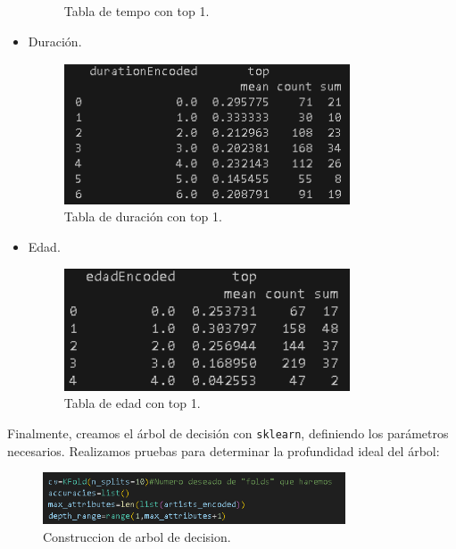 \documentclass[a4paper,12pt]{article}
\begin{document}
\begin{itemize}
\begin{figure}[H]
        \caption{Tabla de tempo con top 1.}
        \label{fig:decision_tree}
    \end{figure}
    \item Duración.
    \begin{figure}[H]
        \centering
        \includegraphics[width=0.8\textwidth]{24.png}
        \caption{Tabla de duración con top 1.}
        \label{fig:decision_tree}
    \end{figure}
    \item Edad.
    \begin{figure}[H]
        \centering
        \includegraphics[width=0.8\textwidth]{25.png}
        \caption{Tabla de edad con top 1.}
        \label{fig:decision_tree}
    \end{figure}
\end{itemize}

Finalmente, creamos el árbol de decisión con \texttt{sklearn}, definiendo los parámetros necesarios. Realizamos pruebas para determinar la profundidad ideal del árbol:

\begin{figure}[H]
    \centering
    \includegraphics[width=0.8\textwidth]{26.png}
    \caption{Construccion de arbol de decision.}
    \label{fig:decision_tree}
\end{figure}
\end{document}
